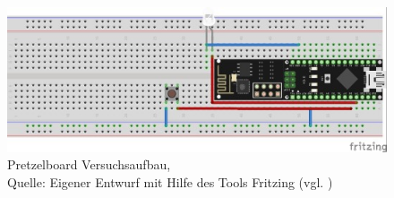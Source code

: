 \begin{figure}[!htb]
	\centering
	\includegraphics[scale=1.5]{Pretzel_Fritzing.jpg}
	\caption[Pretzelboard Versuchsaufbau]{Pretzelboard Versuchsaufbau,\\ Quelle: Eigener Entwurf mit Hilfe des Tools Fritzing (vgl. \cite{.s})}
\end{figure}